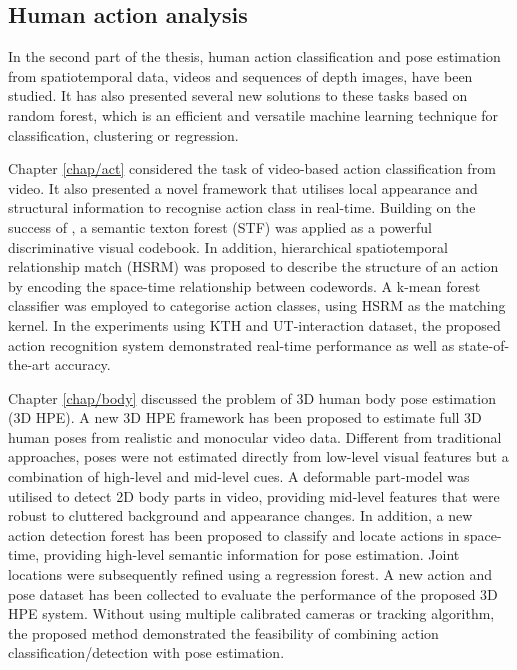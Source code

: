 \subsection{Human action analysis}

In the second part of the thesis, human action classification and pose estimation from spatiotemporal data, \eg videos and sequences of depth images, have been studied. 
It has also presented several new solutions to these tasks based on random forest, which is an efficient and versatile machine learning technique for classification, clustering or regression. 

Chapter \ref{chap/act} considered the task of video-based action classification from video. It also presented a novel framework that utilises local appearance and structural information to recognise action class in real-time. Building on the success of \cite{Shotton2008}, a semantic texton forest (STF) was applied as a powerful discriminative visual codebook. In addition, hierarchical spatiotemporal relationship match (HSRM) was proposed to describe the structure of an action by encoding the space-time relationship between codewords. A k-mean forest classifier was employed to categorise action classes, using HSRM as the matching kernel.   
In the experiments using KTH and UT-interaction dataset, the proposed action recognition system demonstrated real-time performance as well as state-of-the-art accuracy. 

Chapter \ref{chap/body} discussed the problem of 3D human body pose estimation (3D HPE).
A new 3D HPE framework has been proposed to estimate full 3D human poses from realistic and monocular video data. Different from traditional approaches, poses were not estimated directly from low-level visual features but a combination of high-level and mid-level cues. 
A deformable part-model was utilised to detect 2D body parts in video, providing mid-level features that were robust to cluttered background and appearance changes. In addition, a new action detection forest has been proposed to classify and locate actions in space-time, providing high-level semantic information for pose estimation. Joint locations were subsequently refined using a regression forest. A new action and pose dataset has been collected to evaluate the performance of the proposed 3D HPE system. Without using multiple calibrated cameras or tracking algorithm, the proposed method demonstrated the feasibility of combining action classification/detection with pose estimation.  

